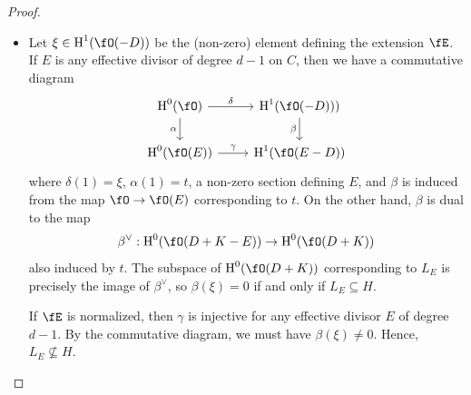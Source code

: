 \documentclass[a4paper]{article}
\begin{document}
\begin{enumerate} [label=\textbf{\arabic*.}, leftmargin=0em]
\begin{proof}
\begin{itemize} [leftmargin=0cm]
                  \item[(b)] Let $\xi \in \cH^1(\fO(-D))$ be the (non-zero) element defining the extension $\fE$.
                        If $E$ is any effective divisor of degree $d - 1$ on $C$, then we have a commutative diagram
                        \[ \begin{tikzcd}
                                \cH^0(\fO) \arrow[r, "\delta"] \arrow[d, "\alpha"'] & \cH^1(\fO(-D))) \arrow[d, "\beta"'] \\
                                \cH^0(\fO(E)) \arrow[r, "\gamma"]    & \cH^1(\fO(E - D))
                            \end{tikzcd} \]
                        where $\delta(1) = \xi$, $\alpha(1) = t$, a non-zero section defining $E$, and $\beta$ is induced from the map $\fO \to \fO(E)$ corresponding to $t$.
                        On the other hand, $\beta$ is dual to the map
                        \begin{equation*}
                            \beta^\vee : \cH^0(\fO(D + K - E)) \to \cH^0(\fO(D + K))
                        \end{equation*}
                        also induced by $t$.
                        The subspace of $\cH^0(\fO(D+K))$ corresponding to $L_E$ is precisely the image of $\beta^\vee$, so $\beta(\xi) = 0$ if and only if $L_E \subseteq H$.

                        If $\fE$ is normalized, then $\gamma$ is injective for any effective divisor $E$ of degree $d - 1$.
                        By the commutative diagram, we must have $\beta(\xi) \neq 0$.
                        Hence, $L_E \nsubseteq H$.


\end{itemize}
\end{proof}
\end{enumerate}
\end{document}
